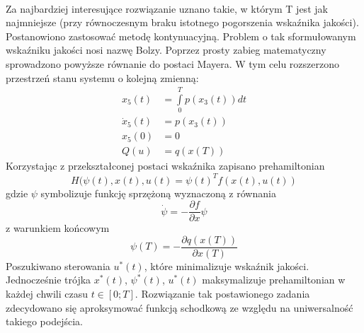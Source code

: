 \paragraph*{}
Za najbardziej interesujące rozwiązanie uznano takie, w którym T jest jak najmniejsze (przy równoczesnym braku istotnego pogorszenia wskaźnika jakości). Postanowiono zastosować metodę kontynuacyjną. \newline
Problem o tak sformułowanym wskaźniku jakości nosi nazwę Bolzy. Poprzez prosty zabieg matematyczny sprowadzono powyższe równanie do postaci Mayera. W tym celu rozszerzono przestrzeń stanu systemu o kolejną zmienną:
\begin{equation}
\begin{aligned}
x_5(t)&=\int\limits_{0}^{T}p(x_3(t))dt \\
\dot{x}_5(t)&=p(x_3(t))\\
x_5(0)&=0\\
Q(u)&=q(x(T))
\end{aligned}
\end{equation}
Korzystając z przekształconej postaci wskaźnika zapisano prehamiltonian
\begin{equation}
H(\psi(t),x(t),u(t)=\psi(t)^Tf(x(t),u(t))
\end{equation}
gdzie $\psi$ symbolizuje funkcję sprzężoną wyznaczoną z równania
\begin{equation}
\dot \psi=-\frac{\partial f}{\partial x}\psi
\end{equation}
z warunkiem końcowym
\begin{equation}
\psi(T)=-\frac{\partial q(x(T))}{\partial x(T)}
\end{equation}
Poszukiwano sterowania $u^*(t)$, które minimalizuje wskaźnik jakości. Jednocześnie trójka $x^*(t)$, $\psi^*(t)$, $u^*(t)$ maksymalizuje prehamiltonian w każdej chwili czasu $t\in[0;T]$. Rozwiązanie tak postawionego zadania zdecydowano się aproksymować funkcją schodkową ze względu na uniwersalność takiego podejścia.

